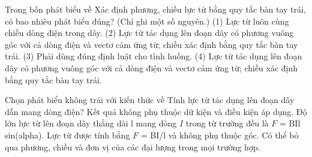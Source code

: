 \begin{ex}
Trong bốn phát biểu về Xác định phương, chiều lực từ bằng quy tắc bàn tay trái, có bao nhiêu phát biểu đúng? (Chỉ ghi một số nguyên.) (1) Lực từ luôn cùng chiều dòng điện trong dây. (2) Lực từ tác dụng lên đoạn dây có phương vuông góc với cả dòng điện và vectơ cảm ứng từ; chiều xác định bằng quy tắc bàn tay trái. (3) Phải dùng đúng định luật cho tình huống. (4) Lực từ tác dụng lên đoạn dây có phương vuông góc với cả dòng điện và vectơ cảm ứng từ; chiều xác định bằng quy tắc bàn tay trái.
\end{ex}

\begin{ex}
Chọn phát biểu không trái với kiến thức về Tính lực từ tác dụng lên đoạn dây dẫn mang dòng điện?
\choice
{Kết quả không phụ thuộc dữ kiện và điều kiện áp dụng.}
{\True Độ lớn lực từ lên đoạn dây thẳng dài l mang dòng $I$ trong từ trường đều là $F$ = BIl sin(alpha).}
{Lực từ được tính bằng $F$ = BI/l và không phụ thuộc góc.}
{Có thể bỏ qua phương, chiều và đơn vị của các đại lượng trong mọi trường hợp.}
\end{ex}

